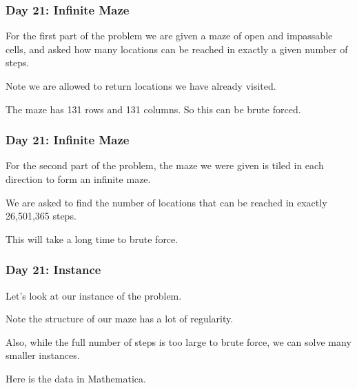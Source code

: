 \begin{frame}
\frametitle{Day 21: Infinite Maze}

For the first part of the problem we are given a maze of open and
impassable cells, and asked how many locations can be reached in exactly
a given number of steps.\vfill

Note we are allowed to return locations we have already visited.\vfill

The maze has 131 rows and 131 columns. So this can be brute forced.
\end{frame}

\begin{frame}
\frametitle{Day 21: Infinite Maze}

For the second part of the problem, the maze we were given is tiled in each direction to form
an infinite maze. \vfill

We are asked to find the number of locations that can be reached in exactly 26,501,365 steps.\vfill

This will take a long time to brute force.

\end{frame}

\begin{frame}
\frametitle{Day 21: Instance}

Let's look at our instance of the problem. \vfill

Note the structure of our maze has a lot of regularity.\vfill

Also, while the full number of steps is too large to brute force,
we can solve many smaller instances.\vfill

Here is the data in Mathematica.
\end{frame}
